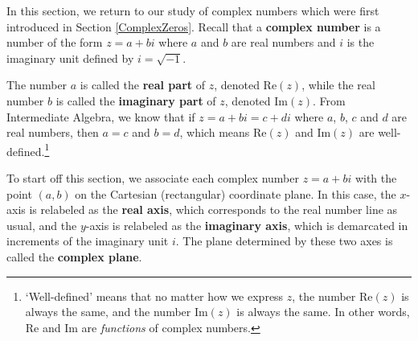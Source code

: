 \documentclass{ximera}
\begin{document}
	\author{Stitz-Zeager}




\setcounter{footnote}{0}

\label{PolarComplex}

In this section, we return to our study of complex numbers which were first introduced in Section \ref{ComplexZeros}.  Recall that a \textbf{complex number} is a number of the form $z = a + bi$ where $a$ and $b$ are real numbers and $i$ is the imaginary unit defined by $i = \sqrt{-1}$. 

\smallskip

The number $a$ is called the  \textbf{real part}  of $z$, denoted  $\text{Re}(z)$, while the real number $b$ is called the  \textbf{imaginary part} of $z$, denoted $\text{Im}(z)$.  From Intermediate Algebra, we know that if $z = a + bi = c + di$ where $a$, $b$, $c$ and $d$ are real numbers, then $a = c$ and $b = d$, which means $\text{Re}(z)$ and $\text{Im}(z)$ are well-defined.\footnote{`Well-defined' means that no matter how we express $z$, the number $\text{Re}(z)$ is always the same, and the number $\text{Im}(z)$ is always the same.  In other words, $\text{Re}$ and $\text{Im}$ are \textit{functions} of complex numbers.} 

\smallskip

To start off this section, we associate each complex number $z = a+bi$ with the point $(a,b)$ on the Cartesian (rectangular) coordinate plane.  In this case, the $x$-axis is relabeled as the \textbf{real axis}, which corresponds to the real number line as usual,  and the $y$-axis is relabeled as the \textbf{imaginary axis}, which is demarcated in increments of the imaginary unit $i$.  The plane determined by these two axes is called the \textbf{complex plane}.
\end{document}
